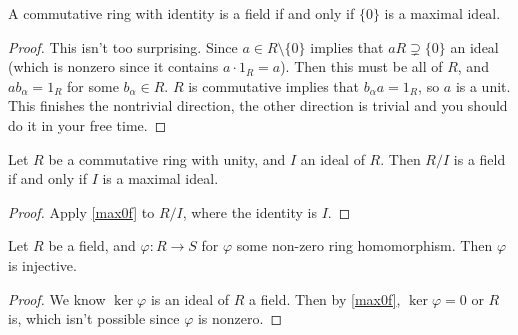 \begin{prop}\label{max0f}
    A commutative ring with identity is a field if and only if $\{0\} $ is a maximal ideal. 
\end{prop}
\begin{proof}
    This isn't too surprising. Since $a\in R\setminus \{0\} $ implies that $aR\supsetneq \{0\} $ an ideal (which is nonzero since it contains $a\cdot 1_R=a$). Then this must be all of $R$, and $ab_{\alpha }=1_R$ for some $b_{\alpha }\in R$. $R$ is commutative implies that $b_{\alpha }a=1_R$, so $a$ is a unit. This finishes the nontrivial direction, the other direction is trivial and you should do it in your free time.
\end{proof}
\begin{cor}
    Let $R$ be a commutative ring with unity, and $I$ an ideal of $R$. Then $R / I$ is a field if and only if $I$ is a maximal ideal.
\end{cor}
\begin{proof}
    Apply \cref{max0f} to $R / I$, where the identity is $I$.
\end{proof}
\begin{cor}
    Let $R$ be a field, and $\varphi \colon R \to S$ for $\varphi $ some non-zero ring homomorphism. Then $\varphi $ is injective.
\end{cor}
\begin{proof}
    We know $\ker \varphi $ is an ideal of $R$ a field. Then by \cref{max0f}, $\ker \varphi =0$ or $R$ is, which isn't possible since $\varphi $ is nonzero.
\end{proof}

